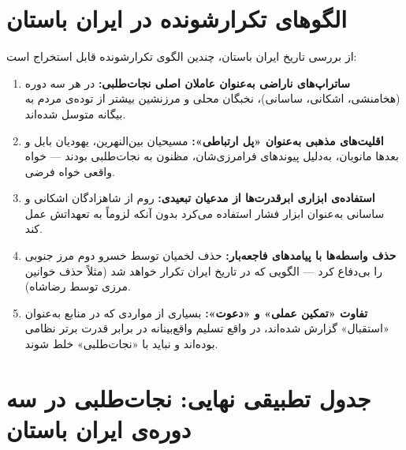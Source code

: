 \section{الگوهای تکرارشونده در ایران باستان}
\label{sec:ch04-patterns}

از بررسی تاریخ ایران باستان، چندین الگوی تکرارشونده قابل استخراج است:

\begin{tcolorbox}[wavebox, title={الگوهای استخراج‌شده}]
\begin{enumerate}[nosep, label=\textbf{الگوی \arabic*:}]
  \item \textbf{ساتراپ‌های ناراضی به‌عنوان عاملان اصلی نجات‌طلبی:} در هر سه دوره (هخامنشی، اشکانی، ساسانی)، نخبگان محلی و مرزنشین بیشتر از توده‌ی مردم به بیگانه متوسل شده‌اند.

  \item \textbf{اقلیت‌های مذهبی به‌عنوان «پل ارتباطی»:} مسیحیان بین‌النهرین، یهودیان بابل و بعدها مانویان، به‌دلیل پیوندهای فرامرزی‌شان، مظنون به نجات‌طلبی بودند — خواه واقعی خواه فرضی.

  \item \textbf{استفاده‌ی ابزاری ابرقدرت‌ها از مدعیان تبعیدی:} روم از شاهزادگان اشکانی و ساسانی به‌عنوان ابزار فشار استفاده می‌کرد بدون آنکه لزوماً به تعهداتش عمل کند.

  \item \textbf{حذف واسطه‌ها با پیامدهای فاجعه‌بار:} حذف لخمیان توسط خسرو دوم مرز جنوبی را بی‌دفاع کرد — الگویی که در تاریخ ایران تکرار خواهد شد (مثلاً حذف خوانین مرزی توسط رضاشاه).

  \item \textbf{تفاوت «تمکین عملی» و «دعوت»:} بسیاری از مواردی که در منابع به‌عنوان «استقبال» گزارش شده‌اند، در واقع تسلیم واقع‌بینانه در برابر قدرت برتر نظامی بوده‌اند و نباید با «نجات‌طلبی» خلط شوند.
\end{enumerate}
\end{tcolorbox}

\section{جدول تطبیقی نهایی: نجات‌طلبی در سه دوره‌ی ایران باستان}
\label{sec:ch04-final-table}

